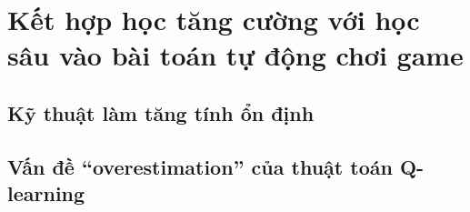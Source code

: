 \section{Kết hợp học tăng cường với học sâu vào bài toán tự động chơi game}

\subsection{Kỹ thuật làm tăng tính ổn định}

\subsection{Vấn đề ``overestimation'' của thuật toán Q-learning}

%
